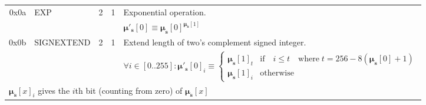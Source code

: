 \documentclass[9pt,oneside]{amsart}
\begin{document}
\begin{tabular*}{\columnwidth}[h]{rlrrl}
\midrule
0x0a & {\small EXP} & 2 & 1 & Exponential operation. \\
&&&& $\boldsymbol{\mu}'_\mathbf{s}[0] \equiv \boldsymbol{\mu}_\mathbf{s}[0] ^ {\boldsymbol{\mu}_\mathbf{s}[1] }$ \\
\midrule
0x0b & {\small SIGNEXTEND} & 2 & 1 & Extend length of two's complement signed integer. \\
&&&& $ \forall i \in [0..255]: \boldsymbol{\mu}'_\mathbf{s}[0]_i \equiv \begin{cases} \boldsymbol{\mu}_\mathbf{s}[1]_t &\text{if} \quad i \leqslant t \quad \text{where} \; t = 256 - 8(\boldsymbol{\mu}_\mathbf{s}[0] + 1) \\ \boldsymbol{\mu}_\mathbf{s}[1]_i &\text{otherwise} \end{cases}$ \\
\multicolumn{5}{l}{$\boldsymbol{\mu}_\mathbf{s}[x]_i$ gives the $i$th bit (counting from zero) of $\boldsymbol{\mu}_\mathbf{s}[x]$} \vspace{5pt} \\
\midrule
\end{tabular*}
\end{document}
